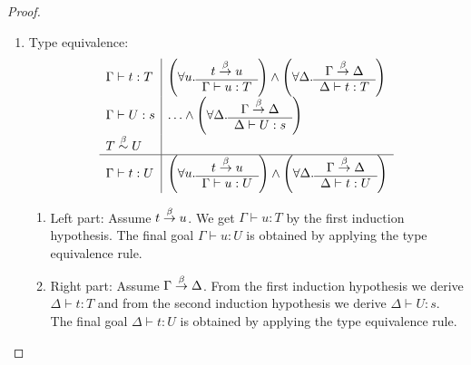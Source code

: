 \begin{theorem}
{\begin{proof}
\begin{enumerate}
\begin{enumerate}
\begin{enumerate}
\begin{enumerate}
                            In that case we get $\Gamma \vdash B : s$ from the
                                second induction hypothesis which implies the
                                final goal $\Gamma, x^B \vdash t : T$ by
                                application of the weakening rule.
                    \end{enumerate}
                \end{enumerate}


                \item Type equivalence:
                $$
                \begin{array}{l|l}
                    \Gamma \vdash t : T
                    &
                    \left( \forall u. \begin{array}{c} t \stackrel{\beta}{\to} u \\ \hline \Gamma \vdash u: T\end{array} \right)
                    \land
                    \left( \forall \Delta. \begin{array}{c} \Gamma \stackrel{\beta}{\to} \Delta \\ \hline \Delta \vdash t: T\end{array} \right)
                    \\
                    \Gamma \vdash U : s
                    &
                    \ldots
                    \land
                    \left( \forall \Delta. \begin{array}{c} \Gamma \stackrel{\beta}{\to} \Delta \\ \hline \Delta \vdash U: s\end{array} \right)
                    \\
                    T \stackrel{\beta}{\sim} U
                    \\
                    \hline
                    \Gamma \vdash t : U
                    &
                    \left( \forall u. \begin{array}{c} t \stackrel{\beta}{\to} u \\ \hline \Gamma \vdash u: U\end{array} \right)
                    \land
                    \left( \forall \Delta. \begin{array}{c} \Gamma \stackrel{\beta}{\to} \Delta \\ \hline \Delta \vdash t: U\end{array} \right)
                \end{array}
                $$
                \begin{enumerate}
                    \item Left part: Assume $t \stackrel{\beta}{\to} u$. We get $\Gamma \vdash
                        u: T$ by the first induction hypothesis. The final goal
                        $\Gamma \vdash u: U$ is obtained by applying the type
                        equivalence rule.

                    \item Right part: Assume $\Gamma \stackrel{\beta}{\to} \Delta$. From the
                        first induction hypothesis we derive $\Delta \vdash t :
                        T$ and from the second induction hypothesis we derive
                        $\Delta \vdash U : s$. The final goal $\Delta \vdash t:
                        U$ is obtained by applying the type equivalence rule.
                \end{enumerate}
            \end{enumerate}
        \end{enumerate}
    \end{proof}
    }
\end{theorem}




